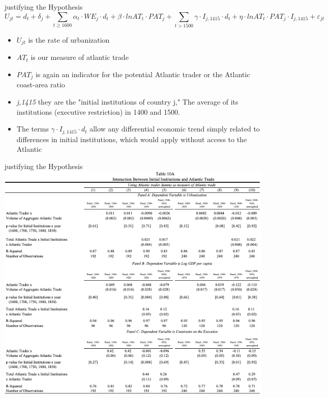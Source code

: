 \documentclass[pdftex,12pt,xcolor=pdftex,table]{beamer}
\theoremstyle{definition}
\theoremstyle{remark}
\numberwithin{equation}{section}
\numberwithin{figure}{section}
\begin{document}
		\begin{frame}{justifying the Hypothesis}
			\justifying
			\centering
			\scriptsize
			\textit{$$U_{jt}=d_{t} + \delta_{j} + \sum_{t\geq1600} \alpha_{t} \cdot WE_{j} \cdot d_{t} + \beta \cdot ln AT_{t} \cdot PAT_{j} + \sum_{t>1500} \gamma \cdot I_{j,1415} \cdot d_{t} + \eta \cdot lnAT_{t} \cdot PAT_{j} \cdot I_{j,1415} + \varepsilon_{jt}$$}
			\small
		     \begin{itemize}
			    \item\textit{$U_{jt}$} is the rate of urbanization
			    \item\textit{$AT_{t}$} is our measure of atlantic trade
			    \item\textit{$PAT_{j}$} is again an indicator for the potential Atlantic trader or the Atlantic coast-area ratio
			    \item\textit{j,1415} they are the "initial institutions of country j," The average of its institutions (executive restriction) in 1400 and 1500.
			    \item The terms \textit{$\gamma \cdot I_{j,1415} \cdot d_{t}$} allow any differential economic trend simply related to differences in initial institutions, which would apply without access to the Atlantic
			\end{itemize}
		\end{frame}	
		\begin{frame}{justifying the Hypothesis}
			\justifying
		    \centering
		    \includegraphics[scale=0.37]{pp12.png}
		\end{frame}
\end{document}
